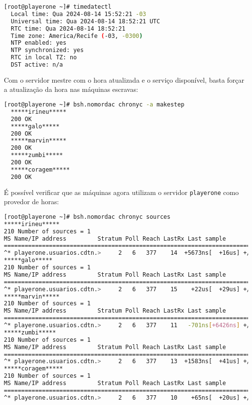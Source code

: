 \begin{lstlisting}[language=bash,basicstyle=\small]
  [root@playerone ~]# timedatectl 
  Local time: Qua 2024-08-14 15:52:21 -03
  Universal time: Qua 2024-08-14 18:52:21 UTC
  RTC time: Qua 2024-08-14 18:52:21
  Time zone: America/Recife (-03, -0300)
  NTP enabled: yes
  NTP synchronized: yes
  RTC in local TZ: no
  DST active: n/a
\end{lstlisting}

Com o servidor mestre com o hora atualizada e o serviço disponível, basta forçar a atualização
da hora nas máquinas escravas:

\begin{lstlisting}[language=bash,basicstyle=\small]
  [root@playerone ~]# bsh.nomordac chronyc -a makestep
  *****irineu*****
  200 OK
  *****galo*****
  200 OK
  *****marvin*****
  200 OK
  *****zumbi*****
  200 OK
  *****coragem*****
  200 OK
\end{lstlisting}

É possível verificar que as máquinas agora utilizam o servidor \texttt{playerone} como provedor
de horas:

\begin{lstlisting}[language=bash,basicstyle=\small]
[root@playerone ~]# bsh.nomordac chronyc sources
*****irineu*****
210 Number of sources = 1
MS Name/IP address         Stratum Poll Reach LastRx Last sample               
===============================================================================
^* playerone.usuarios.cdtn.>     2   6   377    14  +5673ns[  +16us] +/- 5562us
*****galo*****
210 Number of sources = 1
MS Name/IP address         Stratum Poll Reach LastRx Last sample               
===============================================================================
^* playerone.usuarios.cdtn.>     2   6   377    15    +22us[  +29us] +/- 5570us
*****marvin*****
210 Number of sources = 1
MS Name/IP address         Stratum Poll Reach LastRx Last sample               
===============================================================================
^* playerone.usuarios.cdtn.>     2   6   377    11   -701ns[+6426ns] +/- 5563us
*****zumbi*****
210 Number of sources = 1
MS Name/IP address         Stratum Poll Reach LastRx Last sample               
===============================================================================
^* playerone.usuarios.cdtn.>     2   6   377    13  +1583ns[  +41us] +/- 5548us
*****coragem*****
210 Number of sources = 1
MS Name/IP address         Stratum Poll Reach LastRx Last sample               
===============================================================================
^* playerone.usuarios.cdtn.>     2   6   377    10    +65ns[  +20us] +/- 5569us
\end{lstlisting}
